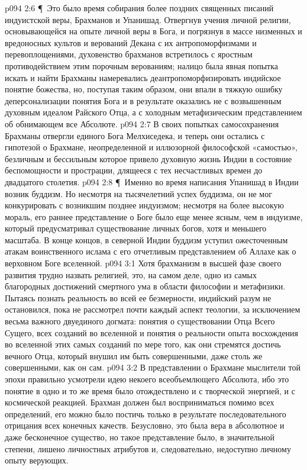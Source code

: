 \vs p094 2:6 \P\ Это было время собирания более поздних священных писаний индуистской веры, Брахманов и Упанишад. Отвергнув учения личной религии, основывающейся на опыте личной веры в Бога, и погрязнув в массе низменных и вредоносных культов и верований Декана с их антропоморфизмами и перевоплощениями, духовенство брахманов встретилось с яростным противодействием этим порочным верованиям; налицо была явная попытка искать и найти  Брахманы намеревались деантропоморфизировать индийское понятие божества, но, поступая таким образом, они впали в тяжкую ошибку деперсонализации понятия Бога и в результате оказались не с возвышенным духовным идеалом Райского Отца, а с холодным метафизическим представлением об обнимающем все Абсолюте.
\vs p094 2:7 В своих попытках самосохранения Брахманы отвергли единого Бога Мелхиседека, и теперь они остались с гипотезой о Брахмане, неопределенной и иллюзорной философской «самостью», безличным и бессильным  которое привело духовную жизнь Индии в состояние беспомощности и прострации, длящееся с тех несчастливых времен до двадцатого столетия.
\vs p094 2:8 \P\ Именно во время написания Упанишад в Индии возник буддизм. Но несмотря на тысячелетний успех буддизма, он не мог конкурировать с возникшим позднее индуизмом; несмотря на более высокую мораль, его раннее представление о Боге было еще менее ясным, чем в индуизме, который предусматривал существование личных богов, хотя и меньшего масштаба. В конце концов, в северной Индии буддизм уступил ожесточенным атакам воинственного ислама с его отчетливым представлением об Аллахе как о верховном Боге вселенной.
\vs p094 3:1 Хотя брахманизм в высшей фазе своего развития трудно назвать религией, это, на самом деле, одно из самых благородных достижений смертного ума в области философии и метафизики. Пытаясь познать реальность во всей ее безмерности, индийский разум не остановился, пока не рассмотрел почти каждый аспект теологии, за исключением весьма важного двуединого догмата: понятия о существовании Отца Всего Сущего, всех созданий во вселенной и понятия о реальности опыта восхождения во вселенной этих самых созданий по мере того, как они стремятся достичь вечного Отца, который внушил им быть совершенными, даже столь же совершенными, как он сам.
\vs p094 3:2 В представлении о Брахмане мыслители той эпохи правильно усмотрели идею некоего всеобъемлющего Абсолюта, ибо это понятие в одно и то же время было отождествлено и с творческой энергией, и с космической реакцией. Брахман должен был восприниматься помимо всех определений, его можно было постичь только в результате последовательного отрицания всех конечных качеств. Безусловно, это была вера в абсолютное и даже бесконечное существо, но такое представление было, в значительной степени, лишено личностных атрибутов и, следовательно, недоступно личному опыту верующих.
